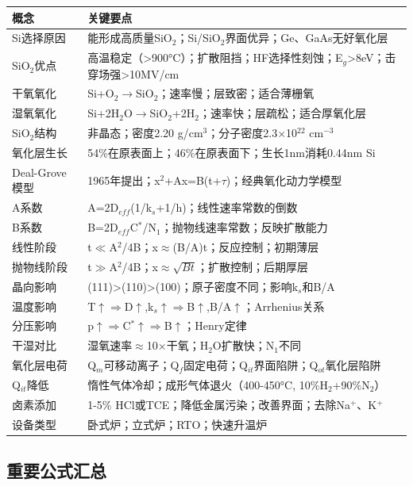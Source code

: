 \documentclass[UTF8,12pt,a4paper]{ctexart}
\begin{document}
\begin{tabular}{|p{4cm}|p{11cm}|}
\hline
\textbf{概念} & \textbf{关键要点} \\
\hline
Si选择原因 & 能形成高质量SiO$_2$；Si/SiO$_2$界面优异；Ge、GaAs无好氧化层 \\
\hline
SiO$_2$优点 & 高温稳定（>900°C）；扩散阻挡；HF选择性刻蚀；E$_g$>8eV；击穿场强>10MV/cm \\
\hline
干氧氧化 & Si+O$_2$$\rightarrow$SiO$_2$；速率慢；层致密；适合薄栅氧 \\
\hline
湿氧氧化 & Si+2H$_2$O$\rightarrow$SiO$_2$+2H$_2$；速率快；层疏松；适合厚氧化层 \\
\hline
SiO$_2$结构 & 非晶态；密度2.20 g/cm$^3$；分子密度2.3$\times$10$^{22}$ cm$^{-3}$ \\
\hline
氧化层生长 & 54\%在原表面上；46\%在原表面下；生长1nm消耗0.44nm Si \\
\hline
Deal-Grove模型 & 1965年提出；x$^2$+Ax=B(t+$\tau$)；经典氧化动力学模型 \\
\hline
A系数 & A=2D$_{eff}$(1/k$_s$+1/h)；线性速率常数的倒数 \\
\hline
B系数 & B=2D$_{eff}$C$^*$/N$_1$；抛物线速率常数；反映扩散能力 \\
\hline
线性阶段 & t$\ll$A$^2$/4B；x$\approx$(B/A)t；反应控制；初期薄层 \\
\hline
抛物线阶段 & t$\gg$A$^2$/4B；x$\approx\sqrt{Bt}$；扩散控制；后期厚层 \\
\hline
晶向影响 & (111)>(110)>(100)；原子密度不同；影响k$_s$和B/A \\
\hline
温度影响 & T$\uparrow$$\Rightarrow$D$\uparrow$,k$_s$$\uparrow$$\Rightarrow$B$\uparrow$,B/A$\uparrow$；Arrhenius关系 \\
\hline
分压影响 & p$\uparrow$$\Rightarrow$C$^*$$\uparrow$$\Rightarrow$B$\uparrow$；Henry定律 \\
\hline
干湿对比 & 湿氧速率$\approx$10$\times$干氧；H$_2$O扩散快；N$_1$不同 \\
\hline
氧化层电荷 & Q$_m$可移动离子；Q$_f$固定电荷；Q$_{it}$界面陷阱；Q$_{ot}$氧化层陷阱 \\
\hline
Q$_{it}$降低 & 惰性气体冷却；成形气体退火（400-450°C, 10\%H$_2$+90\%N$_2$） \\
\hline
卤素添加 & 1-5\% HCl或TCE；降低金属污染；改善界面；去除Na$^+$、K$^+$ \\
\hline
设备类型 & 卧式炉；立式炉；RTO；快速升温炉 \\
\hline
\end{tabular}

\subsection{重要公式汇总}
\end{document}
